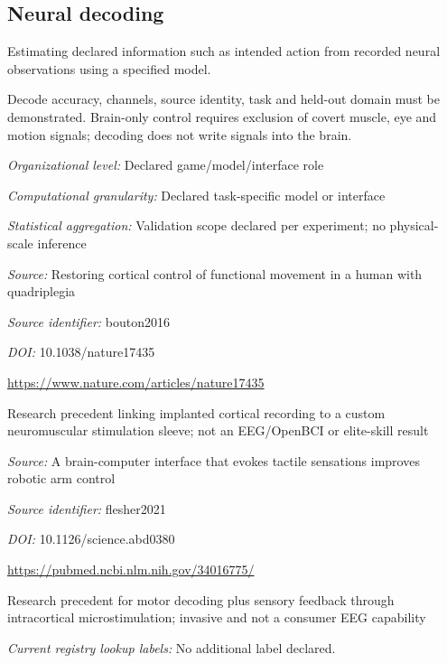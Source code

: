 \begin{samepage}
\subsection*{Neural decoding}
\noindent Estimating declared information such as intended action from recorded neural observations using a specified model.\par
\end{samepage}
\noindent Decode accuracy, channels, source identity, task and held-out domain must be demonstrated. Brain-only control requires exclusion of covert muscle, eye and motion signals; decoding does not write signals into the brain.\par
\noindent\textit{Organizational level:} Declared game/model/interface role\par
\noindent\textit{Computational granularity:} Declared task-specific model or interface\par
\noindent\textit{Statistical aggregation:} Validation scope declared per experiment; no physical-scale inference\par
\noindent\textit{Source:} Restoring cortical control of functional movement in a human with quadriplegia\par
\noindent\textit{Source identifier:} bouton2016\par
\noindent\textit{DOI:} 10.1038/nature17435\par
\noindent\url{https://www.nature.com/articles/nature17435}\par
\noindent Research precedent linking implanted cortical recording to a custom neuromuscular stimulation sleeve; not an EEG/OpenBCI or elite-skill result\par
\noindent\textit{Source:} A brain-computer interface that evokes tactile sensations improves robotic arm control\par
\noindent\textit{Source identifier:} flesher2021\par
\noindent\textit{DOI:} 10.1126/science.abd0380\par
\noindent\url{https://pubmed.ncbi.nlm.nih.gov/34016775/}\par
\noindent Research precedent for motor decoding plus sensory feedback through intracortical microstimulation; invasive and not a consumer EEG capability\par


\noindent\textit{Current registry lookup labels:} No additional label declared.\par

